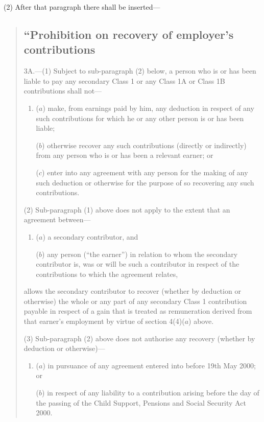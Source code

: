 \documentclass[12pt,a4paper]{article}
\begin{document}
(2) After that paragraph there shall be inserted—
\begin{quotation}
\subsection*{“Prohibition on recovery of employer’s contributions}

3A.---(1) Subject to sub-paragraph (2)  below, a person who is or has been liable to pay any secondary Class 1 or any Class 1A or Class 1B contributions shall not—
\begin{enumerate}\item[]
($a$) make, from earnings paid by him, any deduction in respect of any such contributions for which he or any other person is or has been liable;

($b$) otherwise recover any such contributions (directly or indirectly) from any person who is or has been a relevant earner; or

($c$) enter into any agreement with any person for the making of any such deduction or otherwise for the purpose of so recovering any such contributions.
\end{enumerate}

(2) Sub-paragraph (1)  above does not apply to the extent that an agreement between—
\begin{enumerate}\item[]
($a$) a secondary contributor, and

($b$) any person (“the earner”) in relation to whom the secondary contributor is, was or will be such a contributor in respect of the contributions to which the agreement relates,
\end{enumerate}
allows the secondary contributor to recover (whether by deduction or otherwise) the whole or any part of any secondary Class 1 contribution payable in respect of a gain that is treated as remuneration derived from that earner’s employment by virtue of section 4(4)($a$)  above.

(3) Sub-paragraph (2)  above does not authorise any recovery (whether by deduction or otherwise)—
\begin{enumerate}\item[]
($a$) in pursuance of any agreement entered into before 19th May 2000; or

($b$) in respect of any liability to a contribution arising before the day of the passing of the Child Support, Pensions and Social Security Act 2000. 
\end{enumerate}


\end{quotation}
\end{document}
